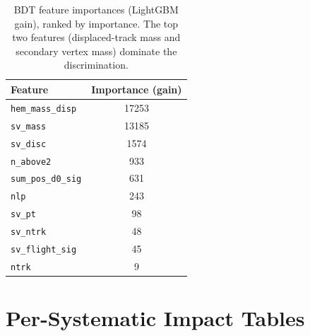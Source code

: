 \documentclass[11pt,a4paper]{article}
\begin{document}
\begin{table}[htbp]
\centering
\caption{BDT feature importances (LightGBM gain), ranked by importance.
  The top two features (displaced-track mass and secondary vertex mass)
  dominate the discrimination.}
\label{tbl:bdt-features}
\begin{tabular}{lc}
\toprule
Feature & Importance (gain) \\
\midrule
\texttt{hem\_mass\_disp}   & 17253 \\
\texttt{sv\_mass}          & 13185 \\
\texttt{sv\_disc}          & 1574  \\
\texttt{n\_above2}         & 933   \\
\texttt{sum\_pos\_d0\_sig} & 631   \\
\texttt{nlp}               & 243   \\
\texttt{sv\_pt}            & 98    \\
\texttt{sv\_ntrk}          & 48    \\
\texttt{sv\_flight\_sig}   & 45    \\
\texttt{ntrk}              & 9     \\
\bottomrule
\end{tabular}
\end{table}

\section{Per-Systematic Impact Tables}
\label{app:syst-tables}
\end{document}
